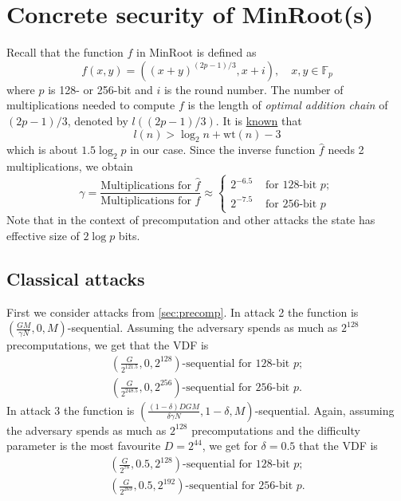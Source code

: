 \documentclass{article}
\begin{document}
 
\section{ Concrete security of MinRoot(s)}

Recall that the  function $f$ in MinRoot is defined as 
$$
f(x,y)
 = ((x+y)^{(2p-1)/3},x+i),\quad x,y\in \mathbb{F}_p
 $$
 where $p$ is 128- or 256-bit and $i$ is the round number. The number of multiplications needed to compute $f$ is the length of \emph{optimal addition chain} of $(2p-1)/3$, denoted by $l((2p-1)/3)$. It is \href{https://www.sciencedirect.com/science/article/pii/0304397575900080}{known} that
 $$
 l(n) > \log_2 n +\mathrm{wt}(n)-3
 $$ which is about $1.5\log_2 p$ in our case. Since the inverse function $\widehat{f}$ needs 2 multiplications, we obtain $$
 \gamma = \frac{\text{Multiplications for }\widehat{f}}{\text{Multiplications for }{f}}\approx
\begin{cases} 2^{-6.5} & \text{ for 128-bit } p;\\ 2^{-7.5}& \text{ for 256-bit }p
\end{cases}
$$
Note that in the context of precomputation and other attacks the state has effective size of $2\log p$ bits.
 
 
 \subsection{Classical attacks}
 
 First we consider attacks from \cref{sec:precomp}. In attack 2 the function is $(\frac{GM}{\gamma N},0,M)$-sequential. Assuming the adversary spends as much as $2^{128}$ precomputations, we get that the VDF is
\begin{align}
(\frac{G}{2^{121.5}},0,2^{128})\text{-sequential for 128-bit }p;\\
(\frac{G}{2^{248.5}},0,2^{256})\text{-sequential for 256-bit }p.
\end{align}
In attack 3 the function is  $\left(\frac{(1-\delta)DGM}{ \delta\gamma N},1-\delta,M\right)$-sequential. Again, assuming the adversary spends as much as $2^{128}$ precomputations
and the difficulty parameter is the most favourite $D=2^{44}$, we get for $\delta=0.5$ that the VDF is
\begin{align}
(\frac{G}{2^{78}},0.5,2^{128})\text{-sequential for 128-bit }p;\\
(\frac{G}{2^{269}},0.5,2^{192})\text{-sequential for 256-bit }p.
\end{align}
\end{document}
